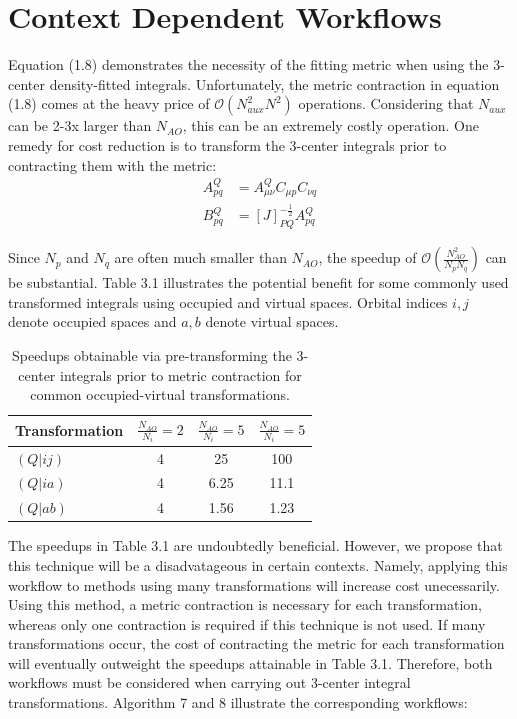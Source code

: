 \section{Context Dependent Workflows}

Equation (1.8) demonstrates the necessity of the fitting metric when using the 3-center density-fitted integrals. Unfortunately, the
metric contraction in equation (1.8) comes at the heavy price of $\mathcal{O}(N_{aux}^2N^2)$ operations.
Considering that $N_{aux}$ can be 2-3x larger
than $N_{AO}$, this can be an extremely costly operation. One remedy for cost reduction is to transform the 3-center integrals prior to contracting
them with the metric:
\begin{align} 
A_{p q}^Q &= A_{\mu \nu}^Q C_{\mu p}C_{\nu q} \\
B_{pq}^Q &= [J]_{PQ}^{-\frac{1}{2}}A_{p q}^Q
\end{align}
 
\noindent Since $N_p$ and $N_q$ are often much smaller than $N_{AO}$, the speedup of 
$\mathcal{O}(\frac{N_{AO}^2}{N_pN_q})$ can be substantial. 
Table 3.1 illustrates the potential benefit for some commonly used transformed integrals using occupied and virtual spaces.
Orbital indices $i,j$ denote occupied spaces and $a,b$ denote virtual spaces.

\begingroup
\begin{table}[H]
\centering
\renewcommand{\baselinestretch}{1}
\caption{Speedups obtainable via pre-transforming the 3-center integrals prior to metric contraction for common occupied-virtual transformations.}
\begin{tabular}{l c c c}
\multicolumn{1}{l}{\textbf{Transformation}} &
\multicolumn{1}{c}{\textbf{$\frac{N_{AO}}{N_i}=2$}} & 
\multicolumn{1}{c}{\textbf{$\frac{N_{AO}}{N_i}=5$}} & 
\multicolumn{1}{c}{\textbf{$\frac{N_{AO}}{N_i}=5$}} \\ 
\hline
$(Q|ij)$       & 4               & 25              & 100      \\ 
$(Q|ia)$       & 4               & 6.25            & 11.1     \\ 
$(Q|ab)$        & 4              & 1.56            & 1.23     \\
\end{tabular}
\end{table}
\endgroup

The speedups in Table 3.1 are undoubtedly beneficial. However, we propose that this technique 
will be a disadvatageous in certain contexts. 
Namely, applying this workflow to methods using many transformations will increase cost unecessarily. 
Using this method, a metric contraction is necessary for each transformation, whereas only one contraction is required if this technique is not used.
If many transformations occur, the cost of contracting the metric for 
each transformation will eventually outweight the speedups attainable in Table 3.1. Therefore, both workflows must be considered when carrying
out 3-center integral transformations. Algorithm 7 and 8 illustrate the corresponding workflows:

